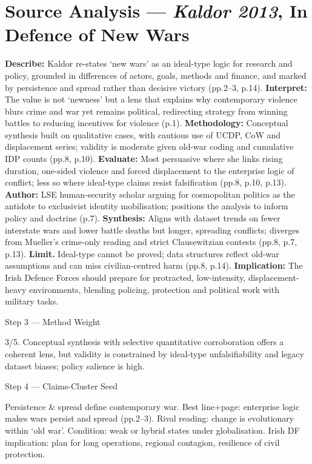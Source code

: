 \section*{Source Analysis — \textit{Kaldor 2013}, In Defence of New Wars}
\textbf{Describe:} Kaldor re-states ‘new wars’ as an ideal-type logic for research and policy, grounded in differences of actors, goals, methods and finance, and marked by persistence and spread rather than decisive victory (pp.2–3, p.14).
\textbf{Interpret:} The value is not ‘newness’ but a lens that explains why contemporary violence blurs crime and war yet remains political, redirecting strategy from winning battles to reducing incentives for violence (p.1).
\textbf{Methodology:} Conceptual synthesis built on qualitative cases, with cautious use of UCDP, CoW and displacement series; validity is moderate given old-war coding and cumulative IDP counts (pp.8, p.10).
\textbf{Evaluate:} Most persuasive where she links rising duration, one-sided violence and forced displacement to the enterprise logic of conflict; less so where ideal-type claims resist falsification (pp.8, p.10, p.13).
\textbf{Author:} LSE human-security scholar arguing for cosmopolitan politics as the antidote to exclusivist identity mobilisation; positions the analysis to inform policy and doctrine (p.7).
\textbf{Synthesis:} Aligns with dataset trends on fewer interstate wars and lower battle deaths but longer, spreading conflicts; diverges from Mueller’s crime-only reading and strict Clausewitzian contests (pp.8, p.7, p.13).
\textbf{Limit.} Ideal-type cannot be proved; data structures reflect old-war assumptions and can miss civilian-centred harm (pp.8, p.14).
\textbf{Implication:} The Irish Defence Forces should prepare for protracted, low-intensity, displacement-heavy environments, blending policing, protection and political work with military tasks.

Step 3 — Method Weight

3/5. Conceptual synthesis with selective quantitative corroboration offers a coherent lens, but validity is constrained by ideal-type unfalsifiability and legacy dataset biases; policy salience is high.

Step 4 — Claims-Cluster Seed

Persistence & spread define contemporary war.
Best line+page: enterprise logic makes wars persist and spread (pp.2–3). Rival reading: change is evolutionary within ‘old war’. Condition: weak or hybrid states under globalisation. Irish DF implication: plan for long operations, regional contagion, resilience of civil protection.

